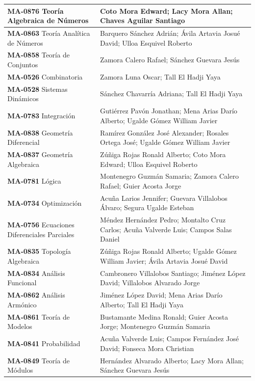 \begin{longtable}{|>{\raggedright\arraybackslash}p{6.9cm}|>{\raggedright\arraybackslash}p{9.8cm}|}
\textbf{MA-0876} Teoría Algebraica de Números & Coto Mora Edward; Lacy Mora Allan; Chaves Aguilar Santiago \\ \hline
\textbf{MA-0863} Teoría Analítica de Números & Barquero Sánchez Adrián; Ávila Artavia Josué David; Ulloa Esquivel Roberto \\ \hline
\textbf{MA-0858} Teoría de Conjuntos & Zamora Calero Rafael; Sánchez Guevara Jesús \\ \hline
\textbf{MA-0526} Combinatoria & Zamora Luna Oscar; Tall El Hadji Yaya \\ \hline
\textbf{MA-0528} Sistemas Dinámicos & Sánchez Chavarría Adriana; Tall El Hadji Yaya \\ \hline
\textbf{MA-0783} Integración & Gutiérrez Pavón Jonathan; Mena Arias Darío Alberto; Ugalde Gómez William Javier \\ \hline
\textbf{MA-0838} Geometría Diferencial & Ramírez González José Alexander; Rosales Ortega José; Ugalde Gómez William Javier \\ \hline
\textbf{MA-0837} Geometría Algebraica & Zúñiga Rojas Ronald Alberto; Coto Mora Edward; Ulloa Esquivel Roberto \\ \hline
\textbf{MA-0781} Lógica & Montenegro Guzmán Samaria; Zamora Calero Rafael; Guier Acosta Jorge \\ \hline
\textbf{MA-0734} Optimización & Acuña Larios Jennifer; Guevara Villalobos Álvaro; Segura Ugalde Esteban \\ \hline
\textbf{MA-0756} Ecuaciones Diferenciales Parciales & Méndez Hernández Pedro; Montalto Cruz Carlos; Acuña Valverde Luis; Campos Salas Daniel \\ \hline
\textbf{MA-0835} Topología Algebraica & Zúñiga Rojas Ronald Alberto; Ugalde Gómez William Javier; Ávila Artavia Josué David \\ \hline
\textbf{MA-0834} Análisis Funcional & Cambronero Villalobos Santiago; Jiménez López David; Villalobos Alvarado Jorge \\ \hline
\textbf{MA-0862} Análisis Armónico & Jiménez López David; Mena Arias Darío Alberto; Tall El Hadji Yaya \\ \hline
\textbf{MA-0861} Teoría de Modelos & Bustamante Medina Ronald; Guier Acosta Jorge; Montenegro Guzmán Samaria \\ \hline
\textbf{MA-0841} Probabilidad & Acuña Valverde Luis; Campos Fernández José David; Fonseca Mora Christian \\ \hline
\textbf{MA-0849} Teoría de Módulos & Hernández Alvarado Alberto; Lacy Mora Allan; Sánchez Guevara Jesús \\ \hline

\end{longtable}
